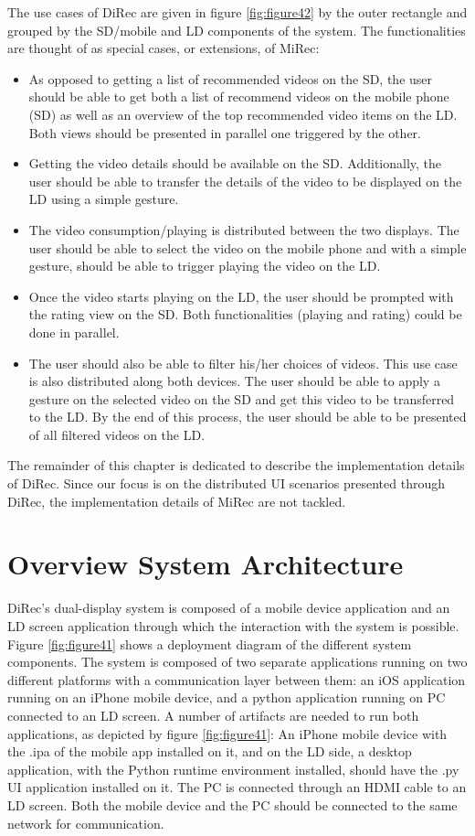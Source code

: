 The use cases of DiRec are given in figure \ref{fig:figure42} by the outer
rectangle and grouped by the SD/mobile and LD components of the system. The
functionalities are thought of as special cases, or extensions, of MiRec:
\begin{itemize}
	\item As opposed to getting a list of recommended videos on the SD, the user
	should be able to get both a list of recommend videos on the mobile phone (SD)
	as well as an overview of the top recommended video items on the LD. Both views should be presented in parallel one triggered by the other.
	\item Getting the video details should be available on the SD. Additionally, the user should be able to transfer the details of the video to be displayed on the LD using a simple gesture. 
	\item The video consumption/playing is distributed between the two displays. The user should be able to select the video on the mobile phone and with a simple gesture, should be able to trigger playing the video on the LD.
 \item Once the video starts playing on the LD, the user should be prompted with the rating view on the SD. Both functionalities (playing and rating) could be done in parallel.
 \item The user should also be able to filter his/her choices of videos. This use case is also distributed along both devices. The user should be able to apply a gesture on the selected video on the SD and get this video to be transferred to the LD. By the end of this process, the user should be able to be presented of all filtered videos on the LD. 
\end{itemize} 
The remainder of this chapter is dedicated to describe the implementation
details of DiRec. Since our focus is on the distributed UI scenarios
presented through DiRec, the implementation details of MiRec are not tackled.

\section{Overview System Architecture}
DiRec's dual-display system is composed of a mobile device application and an LD
screen application through which the interaction with the system is possible.
Figure \ref{fig:figure41} shows a deployment diagram of the different system components. The system is composed of two separate applications running on two different platforms with a communication layer between them: an iOS application running on an iPhone mobile device, and a python application running on PC connected to an LD screen.  A number of artifacts are needed to run both applications, as depicted by figure \ref{fig:figure41}: An iPhone mobile device with the .ipa of the mobile app installed on it, and on the LD side, a desktop application, with the Python runtime environment installed, should have the .py UI application installed on it. The PC is connected through an HDMI cable to an LD screen. Both the mobile device and the PC should be connected to the same network for communication.
    
